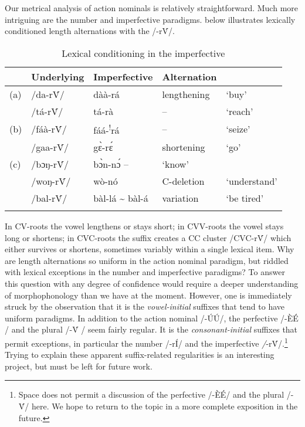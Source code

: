 \documentclass[output=paper
,newtxmath
,modfonts
,nonflat]{langsci/langscibook}
\begin{document}
Our metrical analysis of  action nominals is relatively straightforward. Much more intriguing are the number and imperfective paradigms.  below illustrates lexically conditioned length alternations with the  /-r\'{V}/.

\begin{table}
\begin{tabularx}{\textwidth}{lXXXX}
\lsptoprule
& {Underlying} & {Imperfective} & {Alternation} & \\
\midrule
(a) & /da-r\'{V}/ & dàà-rá & lengthening & ‘buy’\\
& /tá{}-r\'{V}/ & tá-rà & -- & ‘reach’\\
(b) & /fáà-r\'{V}/ & fáá-\textsuperscript{!}rá & -- & ‘seize’\\
& /gaa{}-r\'{V}/ & gɛ̀-rɛ́ & shortening & ‘go’\\
(c) & /bɔŋ-r\'{V}/ & bɔ̀n-nɔ́ -- & ‘know’\\
& /woŋ-r\'{V}/ & wò-nó & C-deletion & ‘understand’\\
& /bal-r\'{V}/ & bàl-lá {\textasciitilde} bàl-á & variation & ‘be tired’\\
\lspbottomrule
\end{tabularx}
\caption{Lexical conditioning in the imperfective}
\label{tab:anttila:15}
\end{table}\largerpage[2]

In CV-roots the vowel lengthens or stays short; in CVV-roots the vowel stays long or shortens; in CVC-roots the suffix creates a CC cluster /CVC-r\'{V}/ which either survives or shortens, sometimes variably within a single lexical item. Why are length alternations so uniform in the action nominal paradigm, but riddled with lexical exceptions in the number and imperfective paradigms? To answer this question with any degree of confidence would require a deeper understanding of  morphophonology than we have at the moment. However, one is immediately struck by the observation that it is the \textit{vowel-initial} suffixes that tend to have uniform paradigms. In addition to the action nominal /-\'{U}\'{U}/, the perfective /-\`{E}\'{E} / and the plural /-\'{V} / seem fairly regular. It is the \textit{consonant-initial} suffixes that permit exceptions, in particular the number /-rÍ/ and the imperfective \textit{/}{}-r\'{V}/.\footnote{Space does not permit a discussion of the perfective /-\`{E}É/ and the plural /-\'{V}/ here. We hope to return to the topic in a more complete exposition in the future.} Trying to explain these apparent suffix-related regularities is an interesting project, but must be left for future work.
\end{document}
